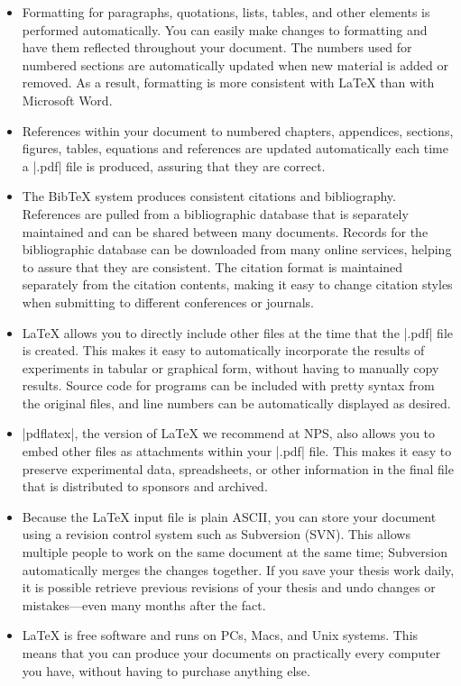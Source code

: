 \begin{itemize}
\item Formatting for paragraphs, quotations, lists, tables, and other
  elements is performed automatically. You can easily make changes to
  formatting and have them reflected throughout your document.  The
  numbers used for numbered sections are automatically updated when
  new material is added or removed. As a result, formatting is more
  consistent with \LaTeX{} than with Microsoft Word.

\item References within your document to numbered chapters,
  appendices, sections, figures, tables, equations and references are
  updated automatically each time a |.pdf| file is produced, assuring
  that they are  correct.

\item The Bib\TeX{} system produces consistent citations and
  bibliography. References are pulled from a bibliographic database
  that is separately maintained and can be shared between many documents. Records for the bibliographic
  database can be downloaded from many online services, helping to
  assure that they are consistent. The citation format is maintained 
  separately from the citation contents, making it easy to change
  citation styles when submitting to different conferences or journals.  
\item \LaTeX{} allows you to directly include other files at the time
  that the |.pdf| file is created. This makes it easy to automatically
  incorporate the results of experiments in tabular or graphical form,
  without having to manually copy results.  Source code for programs
  can be included with pretty syntax from the original files, and line
  numbers can be automatically displayed as desired. 
\item |pdflatex|, the version of \LaTeX{} we recommend at NPS, also
  allows you to embed other files as attachments within your |.pdf| file. This makes it
  easy to preserve  experimental data, spreadsheets, or other
  information in the final file that is distributed to sponsors and archived. 
\item Because the \LaTeX{} input file is plain ASCII, you can store
  your document using a revision control system such as
  Subversion (SVN)\cite{subversion}. This allows multiple people to work on
  the same document at the same time; Subversion automatically merges
  the changes together.  If you save your thesis work daily, it is possible
  retrieve previous revisions of your thesis and undo changes or
  mistakes---even many months after the fact.
\item \LaTeX{} is free software and runs on PCs, Macs, and Unix
  systems. This means that you can produce your documents on
  practically every computer you have, without having to purchase
  anything else.
\end{itemize}


